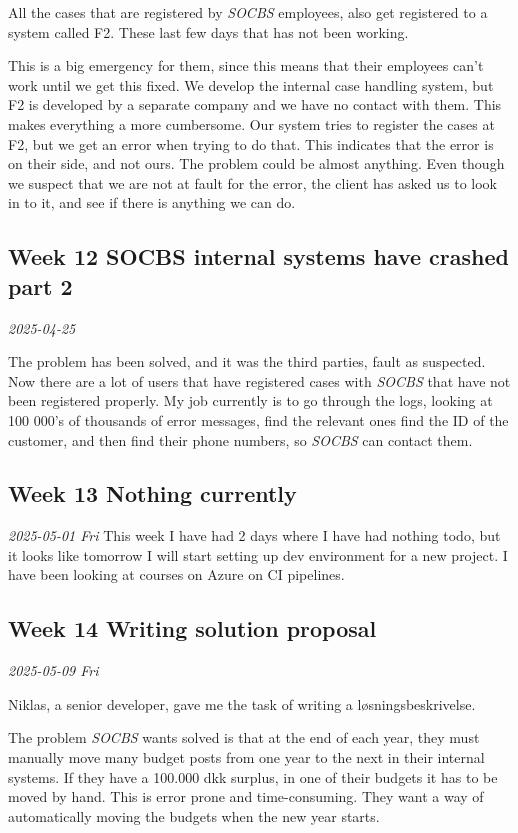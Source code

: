 \documentclass[../main.tex]{subfiles}
\begin{document}
All the cases that are registered by \textit{SOCBS} employees, also get registered to a system called F2. These last few days that has not been working. 

This is a big emergency for them, since this means that their employees can't work until we get this fixed.
We develop the internal case handling system, but F2 is developed by a separate company and we have no contact with them.
This makes everything a more cumbersome. Our system tries to register the cases at F2, but we get an error when trying to do that. 
This indicates that the error is on their side, and not ours. The problem could be almost anything.
Even though we suspect that we are not at fault for the error, the client has asked us to look in to it, and see if there is anything we can do.

\subsection{Week 12 SOCBS internal systems have crashed part 2}

\textit{2025-04-25}

The problem has been solved, and it was the third parties, fault as suspected. Now there are a lot of users that have registered cases with \textit{SOCBS} that have not been registered properly. 
My job currently is to go through the logs, looking at 100 000's of thousands of error messages, find the relevant ones find the ID of the customer, and then find their phone numbers, so \textit{SOCBS} can contact them.

\subsection{Week 13 Nothing currently}
\textit{2025-05-01 Fri}
This week I have had 2 days where I have had nothing todo, but it looks like tomorrow I will start setting up dev environment for a new project. I have been looking at courses on Azure on CI pipelines.

\subsection{Week 14 Writing solution proposal}

\textit{2025-05-09 Fri}

Niklas, a senior developer, gave me the task of writing a løsningsbeskrivelse.

The problem \textit{SOCBS} wants solved is that at the end of each year, they must manually move many budget posts from one year to the next in their internal systems. If they have a 100.000 dkk surplus, in one of their budgets it has to be moved by hand.
This is error prone and time-consuming. They want a way of automatically moving the budgets when the new year starts.
\end{document}
